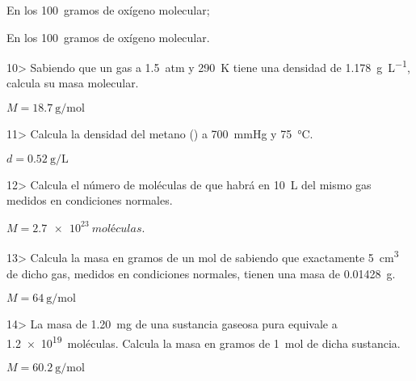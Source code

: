 \documentclass[11pt]{article}
\begin{document}
\begin{multicols}{2}
\begin{solution}
  \begin{enumerate*}
    \item En los \SI{100}{gramos} de oxígeno molecular;
    \item En los \SI{100}{gramos} de oxígeno molecular.
  \end{enumerate*}
\end{solution}

\begin{exercise}
  10> Sabiendo que un gas a \SI{1,5}{atm} y \SI{290}{\kelvin} tiene una densidad de \SI{1,178}{\gram\per\liter}, calcula su masa molecular.
\end{exercise}
\begin{solution}
  $M = \SI{18,7}{\gram\per\mole}$
\end{solution}

\begin{exercise}
  11> Calcula la densidad del metano () a \SI{700}{\mmHg} y \SI{75}{\celsius}.
\end{exercise}
\begin{solution}
  $d = \SI{0,52}{\gram\per\liter}$
\end{solution}

\begin{exercise}
  12> Calcula el número de moléculas de  que habrá en \SI{10}{\liter} del mismo gas medidos en condiciones normales.
\end{exercise}

\begin{solution}
  $M = \SI{2,7e23}{moléculas}$.
\end{solution}

\begin{exercise}
  13> Calcula la masa en gramos de un mol de  sabiendo que
  exactamente \SI{5}{\cubic\centi\meter} de dicho gas, medidos en condiciones
  normales, tienen una masa de \SI{0,01428}{\gram}.
\end{exercise}
\begin{solution}
  $M = \SI{64}{\gram\per\mole}$
\end{solution}

\begin{exercise}
  14> La masa de \SI{1,20}{\milli\gram} de una sustancia gaseosa pura equivale
  a \SI{1,2e19}{moléculas}. Calcula la masa en gramos de \SI{1}{\mole} de dicha sustancia.
\end{exercise}
\begin{solution}
  $M = \SI{60,2}{\gram\per\mole}$
\end{solution}


\end{multicols}
\end{document}
